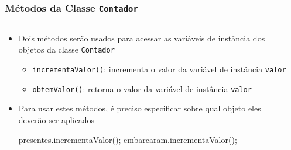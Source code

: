 \documentclass[xcolor={dvipsnames,table},aspectratio=169]{beamer}
\begin{document}
\begin{frame}[fragile]\frametitle{Métodos da Classe \texttt{Contador}}
\begin{columns}[T]
	\begin{column}{0.5\linewidth}
\begin{itemize}
	\item Dois métodos serão usados para acessar as variáveis de instância dos objetos da classe \texttt{Contador}
	\begin{itemize}
		\item \texttt{incrementaValor()}: incrementa o valor da variável de instância \texttt{valor}
		\item \texttt{obtemValor()}: retorna o valor da variável de instância \texttt{valor}
	\end{itemize}
	\item Para usar estes métodos, é preciso especificar sobre qual objeto eles deverão ser aplicados
{\scriptsize
\begin{javacode}
presentes.incrementaValor();
embarcaram.incrementaValor();
\end{javacode}
}	
\end{itemize}
	\end{column}
	\begin{column}{0.5\linewidth}
{\scriptsize\inputminted[bgcolor=cyan!10]{java}{src/contagem0/Contador.java}}
	\end{column}
\end{columns}
\end{frame}
\end{document}
